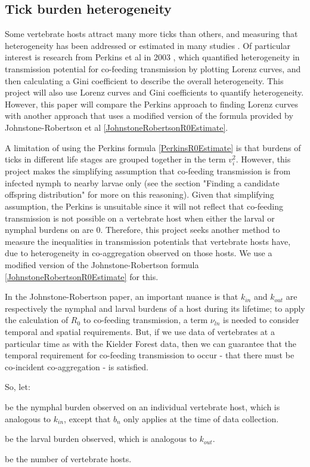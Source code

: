\documentclass{article}
\begin{document}
\subsection{Tick burden heterogeneity}

Some vertebrate hosts attract many more ticks than others, and measuring that heterogeneity has been addressed or estimated in many studies \cite{}. Of particular interest is research from Perkins et al in 2003 \cite{Perkins_2003}, which quantified heterogeneity in transmission potential for co-feeding transmission by plotting Lorenz curves, and then calculating a Gini coefficient to describe the overall heterogeneity. This project will also use Lorenz curves and Gini coefficients to quantify heterogeneity. However, this paper will compare the Perkins approach to finding Lorenz curves with another approach that uses a modified version of the formula provided by Johnstone-Robertson et al \eqref{JohnstoneRobertsonR0Estimate}. 

A limitation of using the Perkins formula \eqref{PerkinsR0Estimate} is that burdens of ticks in different life stages are grouped together in the term $ v_i^2 $. However, this project makes the simplifying assumption that co-feeding transmission is from infected nymph to nearby larvae only (see the section "Finding a candidate offspring distribution" for more on this reasoning). Given that simplifying assumption, the Perkins is unsuitable since it will not reflect that co-feeding transmission is not possible on a vertebrate host when either the larval or nymphal burdens on are $ 0 $. Therefore, this project seeks another method to measure the inequalities in transmission potentials that vertebrate hosts have, due to heterogeneity in co-aggregation observed on those hosts. We use a modified version of the Johnstone-Robertson formula \eqref{JohnstoneRobertsonR0Estimate} for this.

In the Johnstone-Robertson paper, an important nuance is that $ k_{in} $ and $ k_{out} $ are respectively the nymphal and larval burdens of a host during its lifetime; to apply the calculation of $ R_0 $ to co-feeding transmission, a term $ \nu_{ln} $ is needed to consider temporal and spatial requirements. But, if we use data of vertebrates at a particular time as with the Kielder Forest data, then we can guarantee that the temporal requirement for co-feeding transmission to occur - that there must be co-incident co-aggregation - is satisfied.

So, let:

\begin{description}[leftmargin=1cm, style=nextline]
	\item[$ b_n $] be the nymphal burden observed on an individual vertebrate host, which is analogous to $ k_{in} $, except that $ b_n $ only applies at the time of data collection.
	\item[$ b_l $] be the larval burden observed, which is analogous to $ k_{out} $.
	\item[$ m $] be the number of vertebrate hosts.
\end{description}
\end{document}
